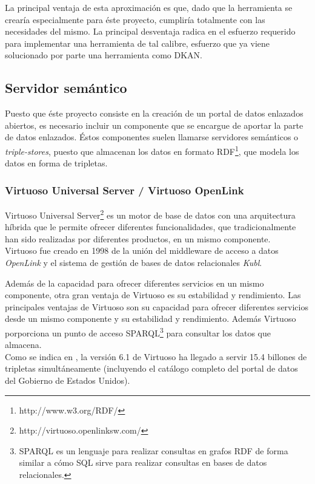 La principal ventaja de esta aproximación es que, dado que la herramienta se crearía especialmente para éste proyecto, cumpliría totalmente con las necesidades del mismo.  La principal desventaja radica en el esfuerzo requerido para implementar una herramienta de tal calibre, esfuerzo que ya viene solucionado por parte una herramienta como DKAN.



\subsection{Servidor semántico}
Puesto que éste proyecto consiste en la creación de un portal de datos enlazados abiertos, es necesario incluir un componente que se encargue de aportar la parte de datos enlazados.  Éstos componentes suelen llamarse servidores semánticos o \textit{triple-stores}, puesto que almacenan los datos en formato RDF\footnote{http://www.w3.org/RDF/}, que modela los datos en forma de tripletas.


\subsubsection{Virtuoso Universal Server / Virtuoso OpenLink}
Virtuoso Universal Server\footnote{http://virtuoso.openlinksw.com/} es un motor de base de datos con una arquitectura híbrida que le permite ofrecer diferentes funcionalidades, que tradicionalmente han sido realizadas por diferentes productos, en un mismo componente.\\
Virtuoso fue creado en 1998 de la unión del middleware de acceso a datos \textit{OpenLink}  y el sistema de gestión de bases de datos relacionales \textit{Kubl}.

Además de la capacidad para ofrecer diferentes servicios en un mismo componente, otra gran ventaja de Virtuoso es su estabilidad y rendimiento.  
Las principales ventajas de Virtuoso son su capacidad para ofrecer diferentes servicios desde un mismo componente y su estabilidad y rendimiento. Además Virtuoso porporciona un punto de acceso SPARQL\footnote{SPARQL es un lenguaje para realizar consultas en grafos RDF de forma similar a cómo SQL sirve para realizar consultas en bases de datos relacionales.} para consultar los datos que almacena.\\
Como se indica en \cite[]{largetriplestores}, la versión 6.1 de Virtuoso ha llegado a servir 15.4 billones de tripletas simultáneamente (incluyendo el catálogo completo del portal de datos del Gobierno de Estados Unidos).

